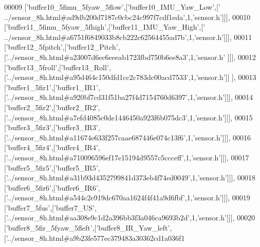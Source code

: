 \begin{DoxyCode}
00009   [\textcolor{stringliteral}{'buffer10\_5fimu\_5fyaw\_5flow'},[\textcolor{stringliteral}{'buffer10\_IMU\_Yaw\_Low'},[\textcolor{stringliteral}{'
      ../sensor\_8h.html#ad9db200d7187c0cbc24c997f7cdf1eda'},1,\textcolor{stringliteral}{'sensor.h'}]]],
00010   [\textcolor{stringliteral}{'buffer11\_5fimu\_5fyaw\_5fhigh'},[\textcolor{stringliteral}{'buffer11\_IMU\_Yaw\_High'},[\textcolor{stringliteral}{'
      ../sensor\_8h.html#a6751f6849033b8cb222c62564455ad7b'},1,\textcolor{stringliteral}{'sensor.h'}]]],
00011   [\textcolor{stringliteral}{'buffer12\_5fpitch'},[\textcolor{stringliteral}{'buffer12\_Pitch'},[\textcolor{stringliteral}{'../sensor\_8h.html#a23007d6ec6eeeab1723fbd750b6ee8a3'},1,\textcolor{stringliteral}{'sensor.h'}
      ]]],
00012   [\textcolor{stringliteral}{'buffer13\_5froll'},[\textcolor{stringliteral}{'buffer13\_Roll'},[\textcolor{stringliteral}{'../sensor\_8h.html#a95d464c150dfd1cc2c783dc00acd7533'},1,\textcolor{stringliteral}{'sensor.h'}]]
      ],
00013   [\textcolor{stringliteral}{'buffer1\_5fir1'},[\textcolor{stringliteral}{'buffer1\_IR1'},[\textcolor{stringliteral}{'../sensor\_8h.html#a920bf7cd31f51ba27f4d7154760d6397'},1,\textcolor{stringliteral}{'sensor.h'}]]],
00014   [\textcolor{stringliteral}{'buffer2\_5fir2'},[\textcolor{stringliteral}{'buffer2\_IR2'},[\textcolor{stringliteral}{'../sensor\_8h.html#a7efd4085c0de1446450a923f6b075dc3'},1,\textcolor{stringliteral}{'sensor.h'}]]],
00015   [\textcolor{stringliteral}{'buffer3\_5fir3'},[\textcolor{stringliteral}{'buffer3\_IR3'},[\textcolor{stringliteral}{'../sensor\_8h.html#a11674e633f257caae687446e074c13f6'},1,\textcolor{stringliteral}{'sensor.h'}]]],
00016   [\textcolor{stringliteral}{'buffer4\_5fir4'},[\textcolor{stringliteral}{'buffer4\_IR4'},[\textcolor{stringliteral}{'../sensor\_8h.html#a710096596ef17e15194d9557c5ccceff'},1,\textcolor{stringliteral}{'sensor.h'}]]],
00017   [\textcolor{stringliteral}{'buffer5\_5fir5'},[\textcolor{stringliteral}{'buffer5\_IR5'},[\textcolor{stringliteral}{'../sensor\_8h.html#a31b93d4352799841d373eb4f74ed0049'},1,\textcolor{stringliteral}{'sensor.h'}]]],
00018   [\textcolor{stringliteral}{'buffer6\_5fir6'},[\textcolor{stringliteral}{'buffer6\_IR6'},[\textcolor{stringliteral}{'../sensor\_8h.html#a544c2e919dc670aa1624f4f41a9d6fbf'},1,\textcolor{stringliteral}{'sensor.h'}]]],
00019   [\textcolor{stringliteral}{'buffer7\_5fus'},[\textcolor{stringliteral}{'buffer7\_US'},[\textcolor{stringliteral}{'../sensor\_8h.html#aa308e9c1d2a396bb3f3a046ca9693b2d'},1,\textcolor{stringliteral}{'sensor.h'}]]],
00020   [\textcolor{stringliteral}{'buffer8\_5fir\_5fyaw\_5fleft'},[\textcolor{stringliteral}{'buffer8\_IR\_Yaw\_left'},[\textcolor{stringliteral}{'../sensor\_8h.html#a9b23fe577ec379483a30362cd1a036f1
}
\end{DoxyCode}
